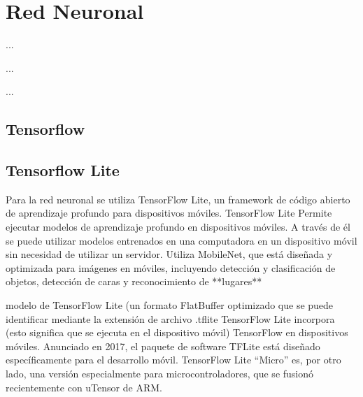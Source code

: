 %
%

\chapter{Red Neuronal}

\begin{FraseCelebre}
\begin{Frase}
...
\end{Frase}
\begin{Fuente}
...
\end{Fuente}
\end{FraseCelebre}

\begin{resumen}
...
\end{resumen}


\section{Tensorflow}
\label{cap4:sec:tensorflow}


\section{Tensorflow Lite}
\label{cap4:sec:tensorflow-lite}

Para la red neuronal se utiliza TensorFlow Lite, un framework de código abierto de aprendizaje profundo para dispositivos móviles. 
TensorFlow Lite Permite ejecutar modelos de aprendizaje profundo en dispositivos móviles. A través de él se puede utilizar modelos entrenados en una computadora en un dispositivo móvil sin necesidad de utilizar un servidor. Utiliza MobileNet, que está diseñada y optimizada para imágenes en móviles, incluyendo detección y clasificación de objetos, detección de caras y reconocimiento de **lugares**

modelo de TensorFlow Lite (un formato FlatBuffer optimizado que se puede identificar mediante la extensión de archivo .tflite
TensorFlow Lite incorpora (esto significa que se ejecuta en el dispositivo móvil) TensorFlow en dispositivos móviles. Anunciado en 2017, el paquete de software TFLite está diseñado específicamente para el desarrollo móvil. TensorFlow Lite “Micro” es, por otro lado, una versión especialmente para microcontroladores, que se fusionó recientemente con uTensor de ARM.



